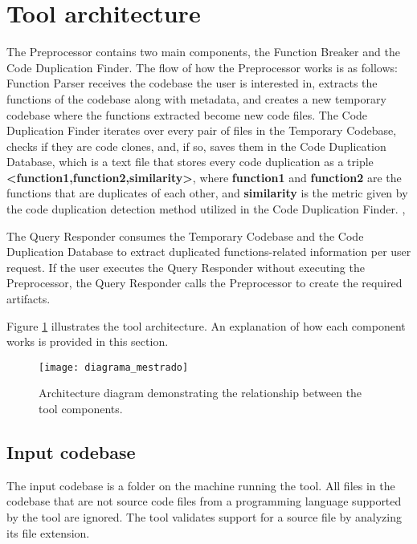 \en

\section{Tool architecture}
\label{subsec:architecture}

The Preprocessor contains two main components, the Function Breaker and the Code Duplication Finder. 
The flow of how the Preprocessor works is as follows: Function Parser receives the codebase the user is interested in,
extracts the functions of the codebase along with metadata, and creates a new temporary codebase where the functions extracted become new code files. 
The Code Duplication Finder iterates over every pair of files in the Temporary Codebase, checks if they are code clones, and, 
if so, saves them in the Code Duplication Database, which is a text file that stores every code duplication as a triple 
\textbf{<function1,function2,similarity>}, where \textbf{function1} and \textbf{function2} are the functions that are duplicates 
of each other, and \textbf{similarity} is the metric given by the code duplication detection method utilized in the Code Duplication Finder. ,

The Query Responder consumes the Temporary Codebase and the Code Duplication Database to extract duplicated 
functions-related information per user request. If the user executes the Query Responder without executing the 
Preprocessor, the Query Responder calls the Preprocessor to create the required artifacts.

Figure \ref{fig:diagram} illustrates the tool architecture. An explanation of how each component works is provided in this section.

\begin{figure}
\texttt{[image: diagrama\_mestrado]}
\caption{Architecture diagram demonstrating the relationship between the tool components.}
\label{fig:diagram}
\end{figure}

\subsection{Input codebase}

The input codebase is a folder on the machine running the tool. All files in the codebase that are not source code files from a programming language supported by the tool are ignored. The tool validates support for a source file by analyzing its file extension.

